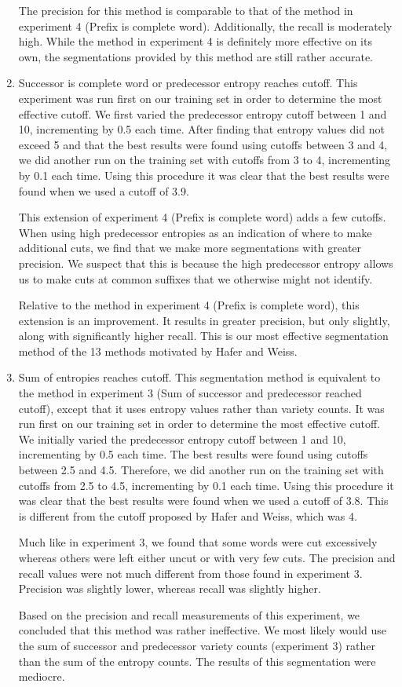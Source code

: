 \documentclass[11pt,letterpaper]{article}
\begin{document}
\begin{enumerate}
The precision for this method is comparable to that of the method in experiment 4 (Prefix is complete word). Additionally, the recall is moderately high. While the method in experiment 4 is definitely more effective on its own, the segmentations provided by this method are still rather accurate.

\item Successor is complete word or predecessor entropy reaches cutoff. This experiment was run first on our training set in order to determine the most effective cutoff. We first varied the predecessor entropy cutoff between 1 and 10, incrementing by 0.5 each time. After finding that entropy values did not exceed 5 and that the best results were found using cutoffs between 3 and 4, we did another run on the training set with cutoffs from 3 to 4, incrementing by 0.1 each time. Using this procedure it was clear that the best results were found when we used a cutoff of 3.9.

This extension of experiment 4 (Prefix is complete word) adds a few cutoffs. When using high predecessor entropies as an indication of where to make additional cuts, we find that we make more segmentations with greater precision. We suspect that this is because the high predecessor entropy allows us to make cuts at common suffixes that we otherwise might not identify.  

Relative to the method in experiment 4 (Prefix is complete word), this extension is an improvement. It results in greater precision, but only slightly, along with significantly higher recall. This is our most effective segmentation method of the 13 methods motivated by Hafer and Weiss.

\item Sum of entropies reaches cutoff. This segmentation method is equivalent to the method in experiment 3 (Sum of successor and predecessor reached cutoff), except that it uses entropy values rather than variety counts. It was run first on our training set in order to determine the most effective cutoff. We initially varied the predecessor entropy cutoff between 1 and 10, incrementing by 0.5 each time. The best results were found using cutoffs between 2.5 and 4.5. Therefore, we did another run on the training set with cutoffs from 2.5 to 4.5, incrementing by 0.1 each time. Using this procedure it was clear that the best results were found when we used a cutoff of 3.8. This is different from the cutoff proposed by Hafer and Weiss, which was 4.

Much like in experiment 3, we found that some words were cut excessively whereas others were left either uncut or with very few cuts. The precision and recall values were not much different from those found in experiment 3. Precision was slightly lower, whereas recall was slightly higher.

Based on the precision and recall measurements of this experiment, we concluded that this method was rather ineffective. We most likely would use the sum of successor and predecessor variety counts (experiment 3) rather than the sum of the entropy counts. The results of this segmentation were mediocre. 
\end{enumerate}
\end{document}
